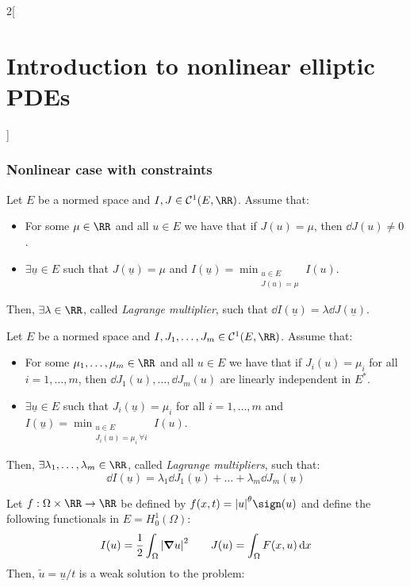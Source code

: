 \documentclass[../../../main_math.tex]{subfiles}
\begin{document}
\begin{multicols}{2}[\section{Introduction to nonlinear elliptic PDEs}]
  \subsubsection{Nonlinear case with constraints}
  \begin{theorem}
    Let $E$ be a normed space and $I,J\in \mathcal{C}^1(E,\RR)$. Assume that:
    \begin{itemize}
      \item For some $\mu\in\RR$ and all $u\in E$ we have that if $J(u)=\mu$, then $\dd{J(u)}\ne0$.
      \item $\exists \underline{u}\in E$ such that $J(\underline{u})=\mu$ and $I(\underline{u})=\displaystyle \min_{\substack{u\in E \\ J(u)=\mu}}I(u)$.
    \end{itemize}
    Then, $\exists \lambda\in\RR$, called \emph{Lagrange multiplier}, such that $\dd{I(\underline{u})}=\lambda \dd{J(\underline{u})}$.
  \end{theorem}
  \begin{theorem}
    Let $E$ be a normed space and $I,J_1,\dots,J_m\in \mathcal{C}^1(E,\RR)$. Assume that:
    \begin{itemize}
      \item For some $\mu_1,\dots,\mu_m\in\RR$ and all $u\in E$ we have that if $J_i(u)=\mu_i$ for all $i=1,\dots,m$, then $\dd{J_1(u)}, \ldots, \dd{J_m(u)}$ are linearly independent in $E^*$.
      \item $\exists \underline{u}\in E$ such that $J_i(\underline{u})=\mu_i$ for all $i=1,\dots,m$ and $I(\underline{u})=\displaystyle \min_{\substack{u\in E \\ J_i(u)=\mu_i\  \forall i}}I(u)$.
    \end{itemize}
    Then, $\exists \lambda_1,\dots,\lambda_m\in\RR$, called \emph{Lagrange multipliers}, such that: $$\dd{I(\underline{u})}=\lambda_1 \dd{J_1(\underline{u})}+\dots+\lambda_m \dd{J_m(\underline{u})}$$
  \end{theorem}
  \begin{proposition}[Aplication]\label{INEPDE:lagrange_apl}
    Let $f:\Omega\times \RR\to\RR$ be defined by $f(x,t)=\abs{u}^{\theta}\sign(u)$ and define the following functionals in $E=H_0^1(\Omega)$:
    $$
      I(u)=\frac{1}{2}\int_\Omega \abs{\grad u}^2\qquad J(u)=\int_\Omega F(x,u)\dd{x}
    $$
    Then, $\tilde{u}=\underline{u}/t$ is a weak solution to the problem:
    \begin{equation}\label{INEPDE:problem_lagrange_apl}

\end{equation}
\end{proposition}
\end{multicols}
\end{document}
